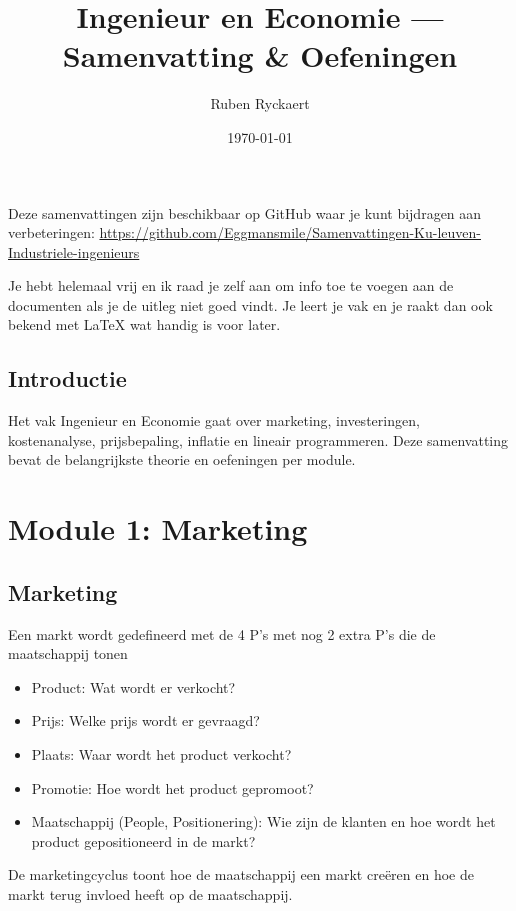 \documentclass[a4paper,11pt]{article}
\title{Ingenieur en Economie — Samenvatting \& Oefeningen}
\author{Ruben Ryckaert}
\date{\today}
\begin{document}
\maketitle
\noindent Deze samenvattingen zijn beschikbaar op GitHub waar je kunt bijdragen aan verbeteringen: \url{https://github.com/Eggmansmile/Samenvattingen-Ku-leuven-Industriele-ingenieurs}

Je hebt helemaal vrij en ik raad je zelf aan om info toe te voegen aan de documenten als je de uitleg niet goed vindt.
Je leert je vak en je raakt dan ook bekend met LaTeX wat handig is voor later.
\tableofcontents

\printformularium

\subsection{Introductie}
Het vak Ingenieur en Economie gaat over marketing,
investeringen, kostenanalyse, prijsbepaling, inflatie en
lineair programmeren. Deze samenvatting bevat de belangrijkste
theorie en oefeningen per module.

\section{Module  1: Marketing}
\subsection{Marketing}

Een markt wordt gedefineerd met de 4 P's met nog 2 extra P's die de maatschappij tonen
\begin{itemize}
    \item Product: Wat wordt er verkocht?
    \item Prijs: Welke prijs wordt er gevraagd?
    \item Plaats: Waar wordt het product verkocht?
    \item Promotie: Hoe wordt het product gepromoot?
    \item Maatschappij (People, Positionering): Wie zijn de klanten en hoe wordt het product gepositioneerd in de markt?
\end{itemize}

De marketingcyclus toont hoe de maatschappij een markt creëren en hoe de markt terug invloed heeft op de maatschappij.
\end{document}
